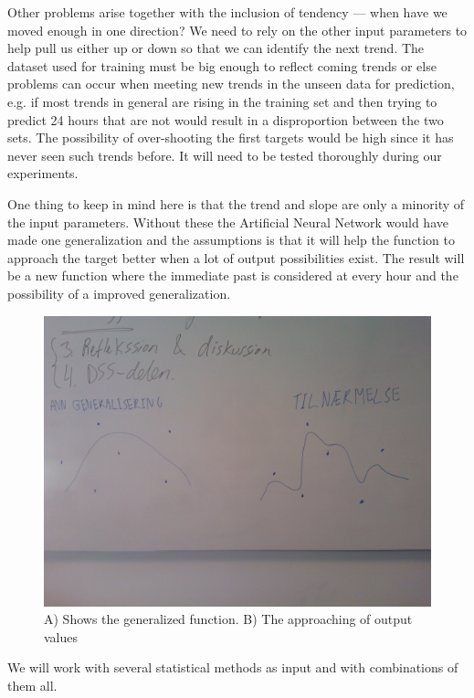 Other problems arise together with the inclusion of tendency --- when have we moved enough in one direction? We need to rely on the other input parameters to help pull us either up or down so that we can identify the next trend. The dataset used for training must be big enough to reflect coming trends or else problems can occur when meeting new trends in the unseen data for prediction, e.g. if most trends in general are rising in the training set and then trying to predict 24 hours that are not would result in a disproportion between the two sets. The possibility of over-shooting the first targets would be high since it has never seen such trends before. It will need to be tested thoroughly during our experiments. 

One thing to keep in mind here is that the trend and slope are only a minority of the input parameters. Without these the Artificial Neural Network would have made one generalization and the assumptions is that it will help the function to approach the target better when a lot of output possibilities exist. The result will be a new function where the immediate past is considered at every hour and the possibility of a improved generalization.

\begin{figure}[H]
\centering
\includegraphics[width=0.99\linewidth,natwidth=898,natheight=587]{billeder/WP_000057.jpg}
\caption{A) Shows the generalized function. B) The approaching of output values}
\label{fig:WP}
\end{figure}

We will work with several statistical methods as input and with combinations of them all. 

